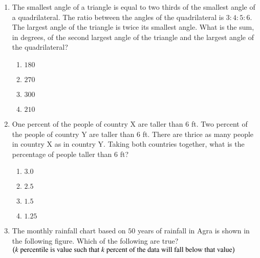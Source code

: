 \documentclass[journal]{IEEEtran}
\begin{document}
\begin{enumerate}
{\begin{table}[H]    
  \centering
  
\end{table}
}
\item{
The smallest angle of a triangle is equal to two thirds of the smallest angle of a quadrilateral. The ratio between the angles of the quadrilateral is $3:4:5:6$. The largest angle of the triangle is twice its smallest angle. What is the sum, in degrees, of the second largest angle of the triangle and the largest angle of the quadrilateral? 
\begin{multicols}{4}
\begin{enumerate}
\item $180$
\item $270$
\item $300$
\item $210$
\end{enumerate}
\end{multicols}
}
\item{
One percent of the people of country X are taller than $6$ ft. Two percent of the people of country Y are taller than $6$ ft. There are thrice as many people in country X as in country Y. Taking both countries together, what is the percentage of people taller than $6$ ft?
\begin{multicols}{4}
\begin{enumerate}
\item $3.0$
\item $2.5$
\item $1.5$
\item $1.25$
\end{enumerate}
\end{multicols}
}
\item{
The monthly rainfall chart based on $50$ years of rainfall in Agra is shown in the following figure. Which of the following are true? $\left(k\text{ percentile is value such that }k\text{ percent of the data will fall below that value}\right)$
\begin{figure}[H]
\centering
{}
\end{figure}}
\end{enumerate}
\end{document}
